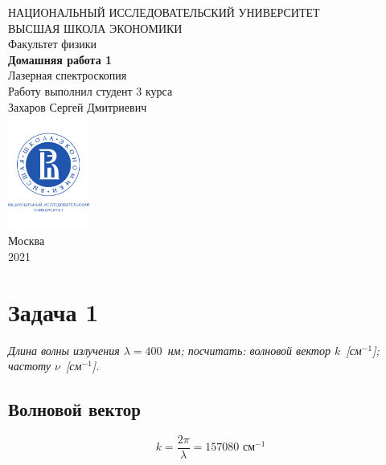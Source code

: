 \documentclass[a4paper, 12pt]{article}
\begin{document}
	\begin{titlepage}
		\begin{center}
			$$$$
			$$$$
			$$$$
			$$$$
			{\Large{НАЦИОНАЛЬНЫЙ ИССЛЕДОВАТЕЛЬСКИЙ УНИВЕРСИТЕТ}}\\
			\vspace{0.1cm}
			{\Large{ВЫСШАЯ ШКОЛА ЭКОНОМИКИ}}\\
			\vspace{0.25cm}
			{\large{Факультет физики}}\\
			\vspace{5.5cm}
			{\Huge\textbf{{Домашняя работа 1}}}\\%
			\vspace{1cm}
			{\LARGE{Лазерная спектроскопия}}\\%
			\vspace{2cm}
			{Работу выполнил студент 3 курса}\\
			{Захаров Сергей Дмитриевич}\\
			\vfill
			\includegraphics[width = 0.2\textwidth]{HSElogo}\\
			\vfill
			Москва\\
			2021
		\end{center}
	\end{titlepage}
	
\tableofcontents


\newpage

\section{Задача 1}

\textit{Длина волны излучения $\lambda = 400$~нм; посчитать: волновой вектор $k$~[см$^{-1}$]; частоту $\nu$~[см$^{-1}$].}

\subsection{Волновой вектор}

\begin{equation}
	k = \frac{2\pi}{\lambda} = 157080 \text{ см$^{-1}$}
\end{equation}
\end{document}
